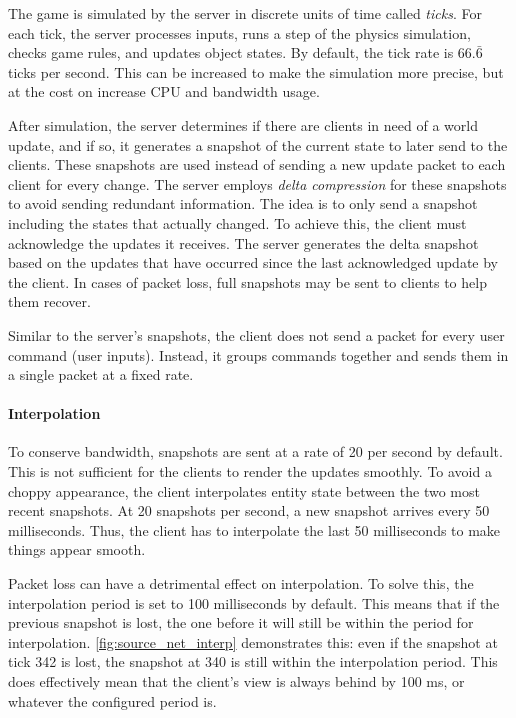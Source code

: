 \documentclass[a4paper, 12pt]{scrartcl}
\begin{document}
The game is simulated by the server in discrete units of time called \textit{ticks}. For each tick, the server processes inputs, runs a step of the physics simulation, checks game rules, and updates object states. By default, the tick rate is $66.\bar6$ ticks per second. This can be increased to make the simulation more precise, but at the cost on increase CPU and bandwidth usage.

After simulation, the server determines if there are clients in need of a world update, and if so, it generates a snapshot of the current state to later send to the clients. These snapshots are used instead of sending a new update packet to each client for every change. The server employs \textit{delta compression} for these snapshots to avoid sending redundant information. The idea is to only send a snapshot including the states that actually changed. To achieve this, the client must acknowledge the updates it receives. The server generates the delta snapshot based on the updates that have occurred since the last acknowledged update by the client. In cases of packet loss, full snapshots may be sent to clients to help them recover.

Similar to the server's snapshots, the client does not send a packet for every user command (user inputs). Instead, it groups commands together and sends them in a single packet at a fixed rate.

\paragraph{Interpolation}
To conserve bandwidth, snapshots are sent at a rate of 20 per second by default. This is not sufficient for the clients to render the updates smoothly. To avoid a choppy appearance, the client interpolates entity state between the two most recent snapshots. At 20 snapshots per second, a new snapshot arrives every 50 milliseconds. Thus, the client has to interpolate the last 50 milliseconds to make things appear smooth.

Packet loss can have a detrimental effect on interpolation. To solve this, the interpolation period is set to 100 milliseconds by default. This means that if the previous snapshot is lost, the one before it will still be within the period for interpolation. \cref{fig:source_net_interp} demonstrates this: even if the snapshot at tick 342 is lost, the snapshot at 340 is still within the interpolation period. This does effectively mean that the client's view is always behind by 100 ms, or whatever the configured period is.
\end{document}
